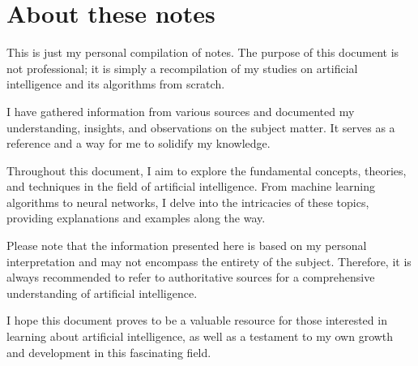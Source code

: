 

\section{About these notes}
This is just my personal compilation of notes. The purpose of this document is not professional;
it is simply a recompilation of my studies on artificial intelligence and its algorithms from scratch.

I have gathered information from various sources and documented my understanding, insights, and observations
on the subject matter. It serves as a reference and a way for me to solidify my knowledge.

Throughout this document, I aim to explore the fundamental concepts, theories, and techniques in the field
of artificial intelligence. From machine learning algorithms to neural networks, I delve into the intricacies
of these topics, providing explanations and examples along the way.

Please note that the information presented here is based on my personal interpretation and may not encompass
the entirety of the subject. Therefore, it is always recommended to refer to authoritative sources for a
comprehensive understanding of artificial intelligence.

I hope this document proves to be a valuable resource for those interested in learning about artificial
intelligence, as well as a testament to my own growth and development in this fascinating field.


